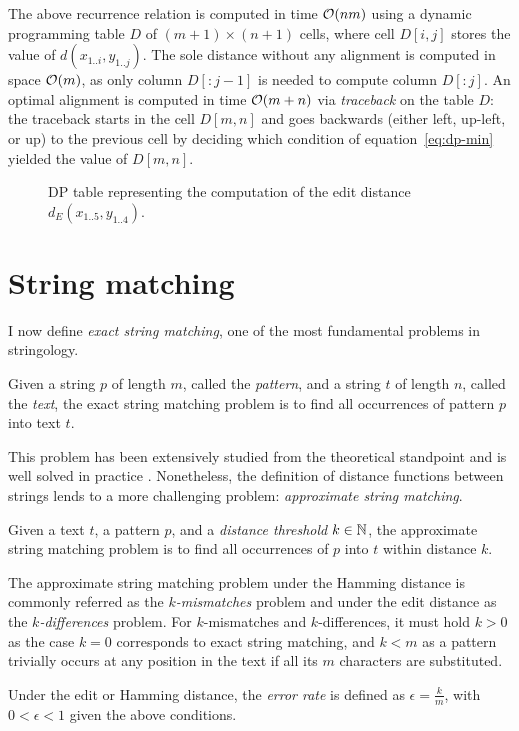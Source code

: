 The above recurrence relation is computed in time $\mathcal{O}(nm)$ using a dynamic programming table $D$ of $(m+1) \times (n+1)$ cells, where cell $D[i,j]$ stores the value of $d(x_{1..i},y_{1..j})$.
The sole distance without any alignment is computed in space $\mathcal{O}(m)$, as only column $D[:j-1]$ is needed to compute column $D[:j]$.
An optimal alignment is computed in time $\mathcal{O}(m + n)$ via \emph{traceback} on the table $D$:
the traceback starts in the cell $D[m,n]$ and goes backwards (either left, up-left, or up) to the previous cell by deciding which condition of equation~\ref{eq:dp-min} yielded the value of $D[m,n]$.

\begin{figure}[h]
\begin{center}
\caption[Example of DP table]{DP table representing the computation of the edit distance $d_E(x_{1..5}, y_{1..4})$.}
\label{fig:edit-dp}

\end{center}
\end{figure}



\section{String matching}

I now define \emph{exact string matching}, one of the most fundamental problems in stringology.
\begin{definition}
\citep{Gusfield1997}
Given a string $p$ of length $m$, called the \emph{pattern}, and a string $t$ of length $n$, called the \emph{text}, the exact string matching problem is to find all occurrences of pattern $p$ into text $t$.
\end{definition}

This problem has been extensively studied from the theoretical standpoint and is well solved in practice \citep{Faro2013}.
Nonetheless, the definition of distance functions between strings lends to a more challenging problem: \emph{approximate string matching}.

\begin{definition}
\citep{Galil1988}
Given a text $t$, a pattern $p$, and a \emph{distance threshold} $k \in \mathbb {N}$, the approximate string matching problem is to find all occurrences of $p$ into $t$ within distance $k$.
\end{definition}
The approximate string matching problem under the Hamming distance is commonly referred as the \emph{$k$-mismatches} problem and under the edit distance as the \emph{$k$-differences} problem.
For $k$-mismatches and $k$-differences, it must hold $k > 0$ as the case $k = 0$ corresponds to exact string matching, and $k < m$ as a pattern trivially occurs at any position in the text if all its $m$ characters are substituted.
\begin{definition}
Under the edit or Hamming distance, the \emph{error rate} is defined as $\epsilon = \frac{k}{m}$, with $0 < \epsilon < 1$ given the above conditions.
\end{definition}

